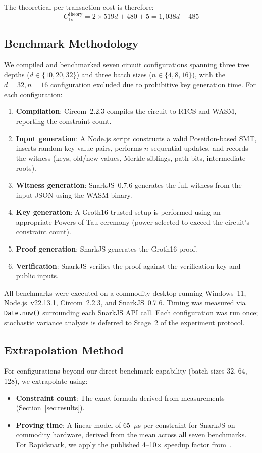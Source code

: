 The theoretical per-transaction cost is therefore:
\begin{equation}
C_{\text{tx}}^{\text{theory}} = 2 \times 519d + 480 + 5 = 1{,}038d + 485
\label{eq:theory-cost}
\end{equation}

\subsection{Benchmark Methodology}

We compiled and benchmarked seven circuit configurations spanning three
tree depths ($d \in \{10, 20, 32\}$) and three batch sizes
($n \in \{4, 8, 16\}$), with the $d{=}32, n{=}16$ configuration
excluded due to prohibitive key generation time. For each configuration:

\begin{enumerate}
\item \textbf{Compilation}: Circom~2.2.3 compiles the circuit to R1CS
  and WASM, reporting the constraint count.
\item \textbf{Input generation}: A Node.js script constructs a valid
  Poseidon-based SMT, inserts random key-value pairs, performs $n$
  sequential updates, and records the witness (keys, old/new values,
  Merkle siblings, path bits, intermediate roots).
\item \textbf{Witness generation}: SnarkJS~0.7.6 generates the full
  witness from the input JSON using the WASM binary.
\item \textbf{Key generation}: A Groth16 trusted setup is performed
  using an appropriate Powers of Tau ceremony (power selected to
  exceed the circuit's constraint count).
\item \textbf{Proof generation}: SnarkJS generates the Groth16 proof.
\item \textbf{Verification}: SnarkJS verifies the proof against the
  verification key and public inputs.
\end{enumerate}

All benchmarks were executed on a commodity desktop running Windows~11,
Node.js~v22.13.1, Circom~2.2.3, and SnarkJS~0.7.6. Timing was measured
via \texttt{Date.now()} surrounding each SnarkJS API call. Each
configuration was run once; stochastic variance analysis is deferred
to Stage~2 of the experiment protocol.

\subsection{Extrapolation Method}

For configurations beyond our direct benchmark capability (batch sizes
32, 64, 128), we extrapolate using:

\begin{itemize}
\item \textbf{Constraint count}: The exact formula derived from
  measurements (Section~\ref{sec:results}).
\item \textbf{Proving time}: A linear model of 65~$\mu$s per constraint
  for SnarkJS on commodity hardware, derived from the mean across all
  seven benchmarks. For Rapidsnark, we apply the published 4--10$\times$
  speedup factor from~\cite{tachyon2024,zkmopro2024}.
\end{itemize}
